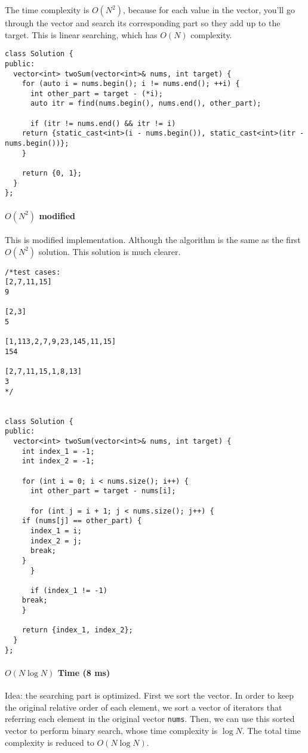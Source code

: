 \documentclass[12pt]{article}
\begin{document}
The time complexity is \(O(N^2)\), because for each value in the vector, you'll go through the vector and search its corresponding part so they add up to the target. This is linear searching, which has \(O(N)\) complexity.
\begin{verbatim}
class Solution {
public:
  vector<int> twoSum(vector<int>& nums, int target) {
    for (auto i = nums.begin(); i != nums.end(); ++i) {
      int other_part = target - (*i);
      auto itr = find(nums.begin(), nums.end(), other_part);

      if (itr != nums.end() && itr != i)
	return {static_cast<int>(i - nums.begin()), static_cast<int>(itr - nums.begin())};
    }

    return {0, 1};
  }
};
\end{verbatim}
\paragraph{\(O(N^2)\) modified}
\label{sec:org701d21b}
This is modified implementation. Although the algorithm is the same as the first \(O(N^2)\) solution. This solution is much clearer.
\begin{verbatim}
/*test cases: 
[2,7,11,15]
9

[2,3]
5

[1,113,2,7,9,23,145,11,15]
154

[2,7,11,15,1,8,13]
3
*/


class Solution {
public:
  vector<int> twoSum(vector<int>& nums, int target) {
    int index_1 = -1;
    int index_2 = -1;

    for (int i = 0; i < nums.size(); i++) {
      int other_part = target - nums[i];

      for (int j = i + 1; j < nums.size(); j++) {
	if (nums[j] == other_part) {
	  index_1 = i;
	  index_2 = j;
	  break;
	}
      }

      if (index_1 != -1)
	break;
    }

    return {index_1, index_2};
  }
};
\end{verbatim}
\paragraph{\(O(N\log{N})\) Time (8 ms)}
\label{sec:org3acf5d4}
Idea: the searching part is optimized. First we sort the vector. In order to keep the original relative order of each element, we sort a vector of iterators that referring each element in the original vector \texttt{nums}. Then, we can use this sorted vector to perform binary search, whose time complexity is \(\log{N}\). The total time complexity is reduced to \(O(N\log{N})\).
\end{document}
